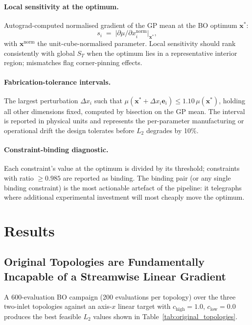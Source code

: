 \documentclass[12pt]{article}
\begin{document}
\paragraph{Local sensitivity at the optimum.} Autograd-computed normalised gradient of the GP mean at the BO optimum $\mathbf{x}^*$:
\begin{equation}
s_i \;=\; \big| \partial \mu / \partial x_i^{\text{norm}} \big|_{\mathbf{x}^*},
\label{eq:local_sens}
\end{equation}
with $\mathbf{x}^{\text{norm}}$ the unit-cube-normalised parameter. Local sensitivity should rank consistently with global $S_T$ when the optimum lies in a representative interior region; mismatches flag corner-pinning effects.

\paragraph{Fabrication-tolerance intervals.} The largest perturbation $\Delta x_i$ such that $\mu(\mathbf{x}^* + \Delta x_i \mathbf{e}_i) \leq 1.10\, \mu(\mathbf{x}^*)$, holding all other dimensions fixed, computed by bisection on the GP mean. The interval is reported in physical units and represents the per-parameter manufacturing or operational drift the design tolerates before $L_2$ degrades by 10\%.

\paragraph{Constraint-binding diagnostic.} Each constraint's value at the optimum is divided by its threshold; constraints with ratio $\geq 0.985$ are reported as binding. The binding pair (or any single binding constraint) is the most actionable artefact of the pipeline: it telegraphs where additional experimental investment will most cheaply move the optimum.

\section{Results}

\subsection{Original Topologies are Fundamentally Incapable of a Streamwise Linear Gradient}
\label{sec:original_three}
A 600-evaluation BO campaign (200 evaluations per topology) over the three two-inlet topologies against an axis-$x$ linear target with $c_{\text{high}} = 1.0$, $c_{\text{low}} = 0.0$ produces the best feasible $L_2$ values shown in Table~\ref{tab:original_topologies}.
\end{document}
